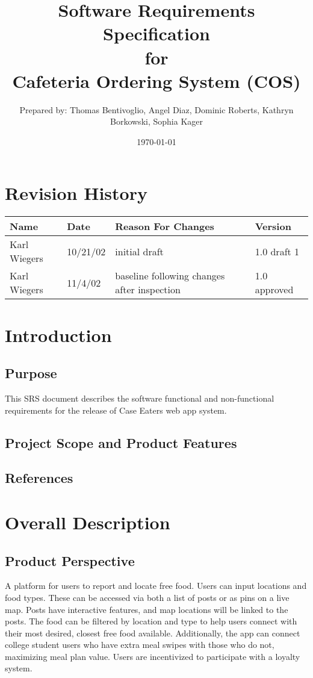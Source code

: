 \documentclass[12pt]{article}
\title{Software Requirements Specification\\
for\\
Cafeteria Ordering System (COS)}
\author{Prepared by: Thomas Bentivoglio, Angel Diaz, Dominic Roberts, Kathryn Borkowski, Sophia Kager}
\date{\today}
\begin{document}
\maketitle
\tableofcontents
\section*{Revision History}
\begin{table}[h!]
\centering
\begin{tabular}{|l|l|l|l|}
\hline
\textbf{Name} & \textbf{Date} & \textbf{Reason For Changes} & \textbf{Version} \\ \hline
Karl Wiegers  & 10/21/02      & initial draft               & 1.0 draft 1      \\ \hline
Karl Wiegers  & 11/4/02       & baseline following changes after inspection & 1.0 approved \\ \hline
\end{tabular}
\end{table}
\newpage

\section{Introduction}
\subsection{Purpose}
This SRS document describes the software functional and non-functional requirements for the release of Case Eaters web app system.
\subsection{Project Scope and Product Features}
\subsection{References}

\section{Overall Description}
\subsection{Product Perspective}
A platform for users to report and locate free food. Users can input locations and food types. These can be accessed via both a list of posts or as pins on a live map. Posts have interactive features, and map locations will be linked to the posts. The food can be filtered by location and type to help users connect with their most desired, closest free food available. Additionally, the app can connect college student users who have extra meal swipes with those who do not, maximizing meal plan value. Users are incentivized to participate with a loyalty system.
\end{document}
